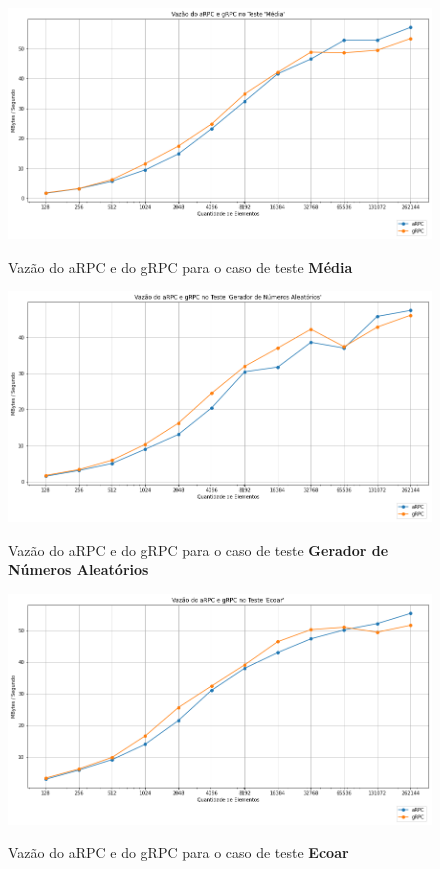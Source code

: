 \begin{figure}[ht]
    \centering
    \caption{Vazão do aRPC e do gRPC para o caso de teste \textbf{Média}}
    \includegraphics[width=\textwidth]{figuras/transporte/vazao_average.png} 
    \label{fig:vazao_average}
\end{figure}

\begin{figure}[ht]
    \centering
    \caption{Vazão do aRPC e do gRPC para o caso de teste \textbf{Gerador de Números Aleatórios}}
    \includegraphics[width=\textwidth]{figuras/transporte/vazao_getrandomnumbers.png} 
    \label{fig:vazao_getrandomnumbers}
\end{figure}

\begin{figure}[ht!]
    \centering
    \caption{Vazão do aRPC e do gRPC para o caso de teste \textbf{Ecoar}}
    \includegraphics[width=\textwidth]{figuras/transporte/vazao_largedata.png} 
    \label{fig:vazao_largedata}
\end{figure}


